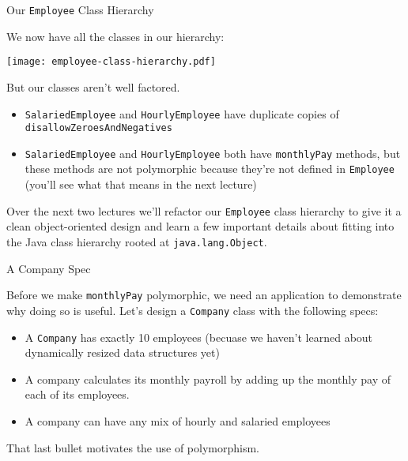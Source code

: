 \documentclass{beamer}
\begin{document}
\begin{frame}[fragile]{Our {\tt Employee} Class Hierarchy}


We now have all the classes in our hierarchy:
\vspace{-.1in}
\begin{center}
\texttt{[image: employee-class-hierarchy.pdf]}
\end{center}
\vspace{-.2in}
But our classes aren't well factored.
\begin{itemize}
\item {\tt SalariedEmployee} and {\tt HourlyEmployee} have duplicate copies of {\tt disallowZeroesAndNegatives}
\item {\tt SalariedEmployee} and {\tt HourlyEmployee} both have {\tt monthlyPay} methods, but these methods are not polymorphic because they're not defined in {\tt Employee} (you'll see what that means in the next lecture)
\end{itemize}

Over the next two lectures we'll refactor our {\tt Employee} class hierarchy to give it a clean object-oriented design and learn a few important details about fitting into the Java class hierarchy rooted at {\tt java.lang.Object}.

\end{frame}

\begin{frame}[fragile]{A Company Spec}


Before we make {\tt monthlyPay} polymorphic, we need an application to demonstrate why doing so is useful.  Let's design a {\tt Company} class with the following specs:

\begin{itemize}
\item A {\tt Company} has exactly 10 employees (becuase we haven't learned about dynamically resized data structures yet)
\item A company calculates its monthly payroll by adding up the monthly pay of each of its employees.
\item A company can have any mix of hourly and salaried employees
\end{itemize}

That last bullet motivates the use of polymorphism.

\end{frame}
\end{document}

